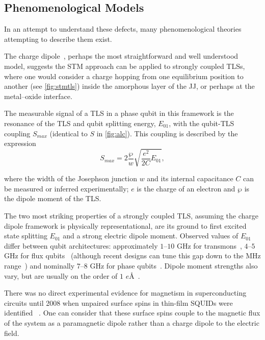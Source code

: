 \subsection{Phenomenological Models}

In an attempt to understand these defects, many phenomenological theories attempting to describe them exist.
 
The charge dipole~\cite{Martinis2005}, perhaps the most straightforward and well understood model, suggests the STM approach can be applied to strongly coupled TLSs, where one would consider a charge hopping from one equilibrium position to another (see \cref{fig:stmtls}) inside the amorphous layer of the JJ, or perhaps at the metal--oxide interface.

The measurable signal of a TLS in a phase qubit in this framework is the resonance of the TLS and qubit splitting energy, $E_{01}$, with the qubit-TLS coupling $S_{max}$ (identical to $S$ in \cref{fig:alc}).
This coupling is described by the expression 
\begin{equation}
    S_{max}=2\frac{\wp}{w}\sqrt{\frac{e^2}{2C}E_{01}},
\label{eq:smax}
\end{equation}

where the width of the Josephson junction $w$ and its internal capacitance $C$ can be measured or inferred experimentally; $e$ is the charge of an electron and $\wp$ is the dipole moment of the TLS.

The two most striking properties of a strongly coupled TLS, assuming the charge dipole framework is physically representational, are its ground to first excited state splitting $E_{01}$ and a strong electric dipole moment.
Observed values of $E_{01}$  differ between qubit architectures: approximately $1$--$10$ GHz for transmons~\cite{Koch2007}, $4$--$5$ GHz for flux qubits~\cite{Lupascu2009} (although recent designs can tune this gap down to the MHz range~\cite{Schwarz2013}) and nominally $7$--$8$ GHz for phase qubits~\cite{Cole2010}.
Dipole moment strengths also vary, but are usually on the order of $1$ $e$\AA\ \cite{Cole2010,Shalibo2010}.

\divtext

There was no direct experimental evidence for magnetism in superconducting circuits until 2008 when unpaired surface spins in thin-film SQUIDs were identified ~\cite{Sendelbach2008}.
One can consider that these surface spins couple to the magnetic flux of the system as a paramagnetic dipole rather than a charge dipole to the electric field.

